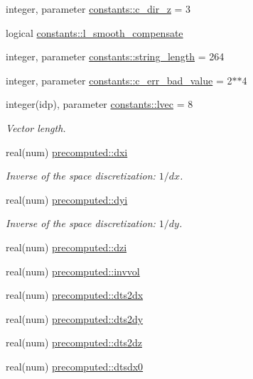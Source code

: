 \begin{DoxyCompactItemize}
integer, parameter \hyperlink{namespaceconstants_a9d2fa70332164d956c148a895e769983}{constants\+::c\+\_\+dir\+\_\+z} = 3
\item 
logical \hyperlink{namespaceconstants_a91e41f33367410db88a66890aae444cc}{constants\+::l\+\_\+smooth\+\_\+compensate}
\item 
integer, parameter \hyperlink{namespaceconstants_a6082bfa433cfb27d3f80d0f32b278570}{constants\+::string\+\_\+length} = 264
\item 
integer, parameter \hyperlink{namespaceconstants_a0c96dab545557ad23bf55d7576f5405f}{constants\+::c\+\_\+err\+\_\+bad\+\_\+value} = 2$\ast$$\ast$4
\item 
integer(idp), parameter \hyperlink{namespaceconstants_a68354913203e3e01c9b0b547e9d95aae}{constants\+::lvec} = 8
\begin{DoxyCompactList}\small\item\em Vector length. \end{DoxyCompactList}\item 
real(num) \hyperlink{namespaceprecomputed_a3277a11e038b89b7572ad654aa6ebdf9}{precomputed\+::dxi}
\begin{DoxyCompactList}\small\item\em Inverse of the space discretization\+: $ 1/dx $. \end{DoxyCompactList}\item 
real(num) \hyperlink{namespaceprecomputed_aba4c7d47df04f7bff362b159a9507bd0}{precomputed\+::dyi}
\begin{DoxyCompactList}\small\item\em Inverse of the space discretization\+: $ 1/dy $. \end{DoxyCompactList}\item 
real(num) \hyperlink{namespaceprecomputed_a3c123d2eff796366a81e11166d6c27ff}{precomputed\+::dzi}
\item 
real(num) \hyperlink{namespaceprecomputed_a6292a71558c6ec034afe504b6cf7b513}{precomputed\+::invvol}
\item 
real(num) \hyperlink{namespaceprecomputed_a49f042055cd92a009da4a02b628430f7}{precomputed\+::dts2dx}
\item 
real(num) \hyperlink{namespaceprecomputed_a173032b2394c4ed6da5fb1364fe17e6a}{precomputed\+::dts2dy}
\item 
real(num) \hyperlink{namespaceprecomputed_af41461f1d38aa90f6b75318b3a6e8b70}{precomputed\+::dts2dz}
\item 
real(num) \hyperlink{namespaceprecomputed_a2bd90255663762ded81c6d3dbdcc19d7}{precomputed\+::dtsdx0}
$$
\end{DoxyCompactItemize}
